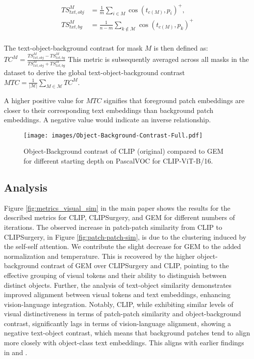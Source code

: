 \documentclass[10pt,twocolumn,letterpaper]{article}
\begin{document}
\begin{equation}
    \begin{aligned}
        TS^{M}_{txt, obj} &= \frac{1}{m} \sum\limits_{i\in M} \cos(t_{c(M)}, p_i)^+, \\
        TS^{M}_{txt, bg} &= \frac{1}{n-m} \sum\limits_{k \notin \mathcal{M}} \cos(t_{c(M)}, p_k)^+ \\
    \end{aligned}
\end{equation}

The text-object-background contrast for mask $M$ is then defined as: $TC^M = \frac{TS^M_{txt, obj} - TS^M_{txt, bg}}{TS^M_{txt, obj} + TS^M_{txt, bg}}$
This metric is subsequently averaged across all masks in the dataset to derive the global text-object-background contrast $MTC = \frac{1}{|\mathcal{M}|} \sum_{M \in \mathcal{M}} TC^M$.

A higher positive value for $MTC$ signifies that foreground patch embeddings are closer to their corresponding text embeddings than background patch embeddings. A negative value would indicate an inverse relationship.



\begin{figure}[t]
      \texttt{[image: images/Object-Background-Contrast-Full.pdf]}
      \vspace{-2.5em}
     \caption{Object-Background contrast of CLIP (original) compared to GEM for different starting depth on PascalVOC for CLIP-ViT-B/16. }\label{fig:depth_obj_bg_contrast_plots}
     \vspace{-2em}
\end{figure}


\subsection{Analysis}
Figure \ref{fig:metrics_visual_sim} in the main paper shows the results for the described metrics for CLIP, CLIPSurgery, and GEM for different numbers of iterations.
The observed increase in patch-patch similarity from CLIP to CLIPSurgery, in Figure \ref{fig:patch-patch-sim}, is due to the clustering induced by the self-self attention. 
We contribute the slight decrease for GEM to the added normalization and temperature. 
This is recovered by the higher object-background contrast of GEM over CLIPSurgery and CLIP, pointing to the effective grouping of visual tokens and their ability to distinguish between distinct objects.
Further, the analysis of text-object similarity demonstrates improved alignment between visual tokens and text embeddings, enhancing vision-language integration. 
Notably, CLIP, while exhibiting similar levels of visual distinctiveness in terms of patch-patch similarity and object-background contrast, significantly lags in terms of vision-language alignment, showing a negative text-object contrast, which means that background patches tend to align more closely with object-class text embeddings. This aligns with earlier findings in \citet{li2023clipsurgery} and \citet{mukhoti2023open}. 
\end{document}
